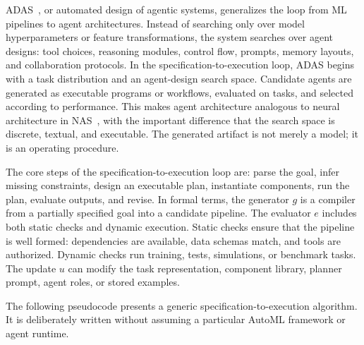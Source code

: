 ADAS~\cite{adas2025}, or automated design of agentic systems, generalizes the loop from ML pipelines to agent architectures.  Instead of searching only over model hyperparameters or feature transformations, the system searches over agent designs: tool choices, reasoning modules, control flow, prompts, memory layouts, and collaboration protocols.  In the specification-to-execution loop, ADAS begins with a task distribution and an agent-design search space.  Candidate agents are generated as executable programs or workflows, evaluated on tasks, and selected according to performance.  This makes agent architecture analogous to neural architecture in NAS~\cite{zoph2018learning,pham2018efficient,liu2018darts}, with the important difference that the search space is discrete, textual, and executable.  The generated artifact is not merely a model; it is an operating procedure.

The core steps of the specification-to-execution loop are: parse the goal, infer missing constraints, design an executable plan, instantiate components, run the plan, evaluate outputs, and revise.  In formal terms, the generator $g$ is a compiler from a partially specified goal into a candidate pipeline.  The evaluator $e$ includes both static checks and dynamic execution.  Static checks ensure that the pipeline is well formed: dependencies are available, data schemas match, and tools are authorized.  Dynamic checks run training, tests, simulations, or benchmark tasks.  The update $u$ can modify the task representation, component library, planner prompt, agent roles, or stored examples.

The following pseudocode presents a generic specification-to-execution algorithm.  It is deliberately written without assuming a particular AutoML framework or agent runtime.

